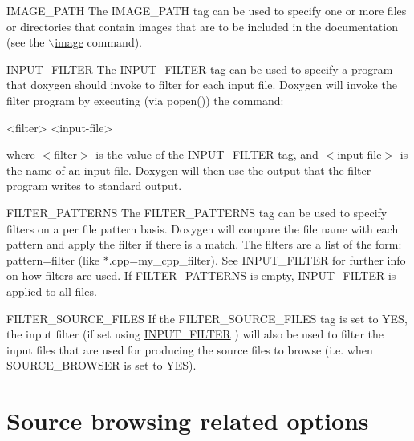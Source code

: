 \begin{DoxyDescription}
\label{config_cfg_image_path}
\hypertarget{config_cfg_image_path}{}
 
\item[{\ttfamily IMAGE\_\-PATH} ] The {\ttfamily IMAGE\_\-PATH} tag can be used to specify one or more files or directories that contain images that are to be included in the documentation (see the \hyperlink{commands_cmdimage}{$\backslash$image} command).

\label{config_cfg_input_filter}
\hypertarget{config_cfg_input_filter}{}
 
\item[{\ttfamily INPUT\_\-FILTER} ] The {\ttfamily INPUT\_\-FILTER} tag can be used to specify a program that doxygen should invoke to filter for each input file. Doxygen will invoke the filter program by executing (via popen()) the command: \begin{DoxyVerb}<filter> <input-file>
\end{DoxyVerb}


where $<$filter$>$ is the value of the {\ttfamily INPUT\_\-FILTER} tag, and $<$input-\/file$>$ is the name of an input file. Doxygen will then use the output that the filter program writes to standard output.

\label{config_cfg_filter_patterns}
\hypertarget{config_cfg_filter_patterns}{}
 
\item[{\ttfamily FILTER\_\-PATTERNS} ] The {\ttfamily FILTER\_\-PATTERNS} tag can be used to specify filters on a per file pattern basis. Doxygen will compare the file name with each pattern and apply the filter if there is a match. The filters are a list of the form: pattern=filter (like {\ttfamily $\ast$.cpp=my\_\-cpp\_\-filter}). See {\ttfamily INPUT\_\-FILTER} for further info on how filters are used. If {\ttfamily FILTER\_\-PATTERNS} is empty, {\ttfamily INPUT\_\-FILTER} is applied to all files.

\label{config_cfg_filter_source_files}
\hypertarget{config_cfg_filter_source_files}{}
 
\item[{\ttfamily FILTER\_\-SOURCE\_\-FILES} ] If the {\ttfamily FILTER\_\-SOURCE\_\-FILES} tag is set to {\ttfamily YES}, the input filter (if set using \hyperlink{config_cfg_input_filter}{INPUT\_\-FILTER} ) will also be used to filter the input files that are used for producing the source files to browse (i.e. when SOURCE\_\-BROWSER is set to YES).


\end{DoxyDescription}\hypertarget{config_sourcebrowser_index}{}\section{Source browsing related options}\label{config_sourcebrowser_index}
\label{config_cfg_source_browser}
\hypertarget{config_cfg_source_browser}{}
 
